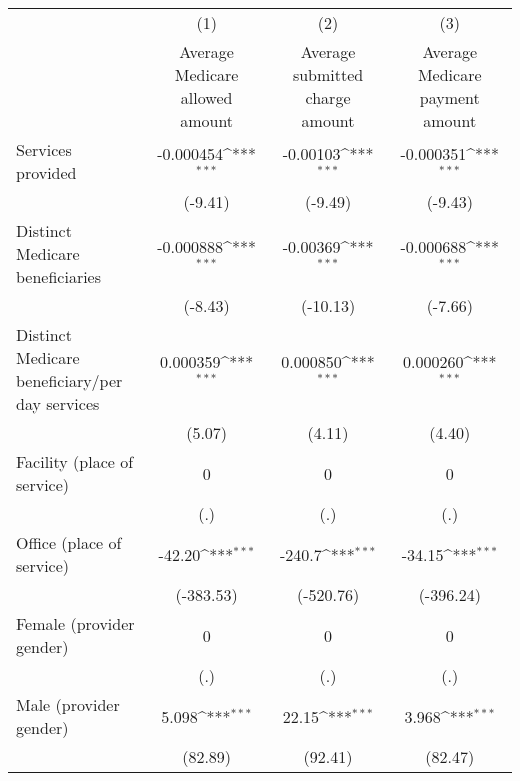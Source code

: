 \def\sym#1{\ifmmode^{#1}\else\(^{#1}\)\fi}
\begin{adjustbox}{max
width={\textwidth},caption={Average Medicare Payment Amount over Time, by Procedure Type per Provider\label{table:PUF1}},nofloat=table}
\begin{tabular}{l*{3}{c}}
\toprule
                    &\multicolumn{1}{c}{(1)}&\multicolumn{1}{c}{(2)}&\multicolumn{1}{c}{(3)}\\
                    &\multicolumn{1}{c}{Average Medicare allowed amount}&\multicolumn{1}{c}{Average submitted charge amount}&\multicolumn{1}{c}{Average Medicare payment amount}\\
\midrule
Services provided   &   -0.000454\sym{***}&    -0.00103\sym{***}&   -0.000351\sym{***}\\
                    &     (-9.41)         &     (-9.49)         &     (-9.43)         \\
\addlinespace
Distinct Medicare beneficiaries&   -0.000888\sym{***}&    -0.00369\sym{***}&   -0.000688\sym{***}\\
                    &     (-8.43)         &    (-10.13)         &     (-7.66)         \\
\addlinespace
Distinct Medicare beneficiary/per day services&    0.000359\sym{***}&    0.000850\sym{***}&    0.000260\sym{***}\\
                    &      (5.07)         &      (4.11)         &      (4.40)         \\
\addlinespace
Facility (place of service)&           0         &           0         &           0         \\
                    &         (.)         &         (.)         &         (.)         \\
\addlinespace
Office (place of service)&      -42.20\sym{***}&      -240.7\sym{***}&      -34.15\sym{***}\\
                    &   (-383.53)         &   (-520.76)         &   (-396.24)         \\
\addlinespace
Female (provider gender)&           0         &           0         &           0         \\
                    &         (.)         &         (.)         &         (.)         \\
\addlinespace
Male (provider gender)&       5.098\sym{***}&       22.15\sym{***}&       3.968\sym{***}\\
                    &     (82.89)         &     (92.41)         &     (82.47)         \\

\end{tabular}
\end{adjustbox}
